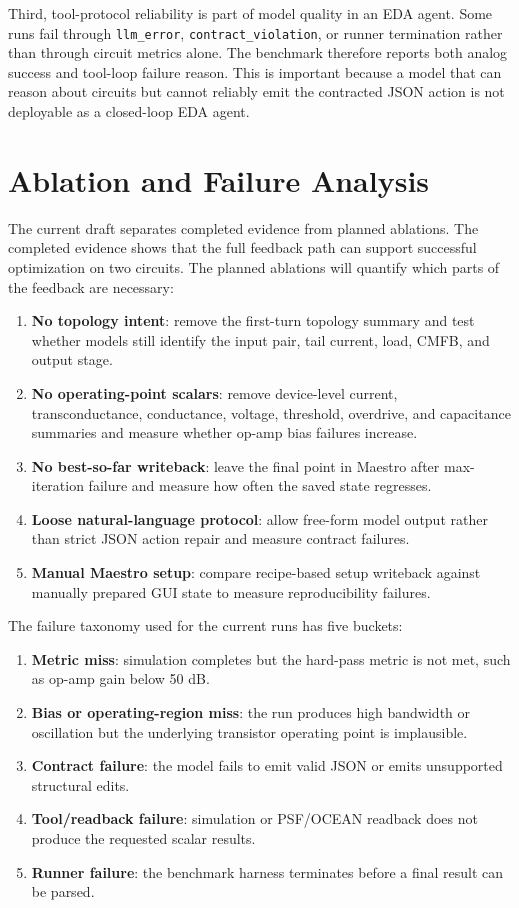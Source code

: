 \documentclass[acmsmall,review,anonymous]{acmart}
\newcommand{\metric}[1]{\texttt{#1}}
\begin{document}
Third, tool-protocol reliability is part of model quality in an EDA agent. Some
runs fail through \metric{llm\_error}, \metric{contract\_violation}, or runner
termination rather than through circuit metrics alone. The benchmark therefore
reports both analog success and tool-loop failure reason. This is important
because a model that can reason about circuits but cannot reliably emit the
contracted JSON action is not deployable as a closed-loop EDA agent.

\section{Ablation and Failure Analysis}
\label{sec:ablation}

The current draft separates completed evidence from planned ablations. The
completed evidence shows that the full feedback path can support successful
optimization on two circuits. The planned ablations will quantify which parts
of the feedback are necessary:
\begin{enumerate}
  \item \textbf{No topology intent}: remove the first-turn topology summary and
  test whether models still identify the input pair, tail current, load, CMFB,
  and output stage.
  \item \textbf{No operating-point scalars}: remove device-level current,
  transconductance, conductance, voltage, threshold, overdrive, and capacitance
  summaries and measure whether op-amp bias failures increase.
  \item \textbf{No best-so-far writeback}: leave the final point in Maestro
  after max-iteration failure and measure how often the saved state regresses.
  \item \textbf{Loose natural-language protocol}: allow free-form model output
  rather than strict JSON action repair and measure contract failures.
  \item \textbf{Manual Maestro setup}: compare recipe-based setup writeback
  against manually prepared GUI state to measure reproducibility failures.
\end{enumerate}

The failure taxonomy used for the current runs has five buckets:
\begin{enumerate}
  \item \textbf{Metric miss}: simulation completes but the hard-pass metric is
  not met, such as op-amp gain below 50 dB.
  \item \textbf{Bias or operating-region miss}: the run produces high bandwidth
  or oscillation but the underlying transistor operating point is implausible.
  \item \textbf{Contract failure}: the model fails to emit valid JSON or emits
  unsupported structural edits.
  \item \textbf{Tool/readback failure}: simulation or PSF/OCEAN readback does
  not produce the requested scalar results.
  \item \textbf{Runner failure}: the benchmark harness terminates before a
  final result can be parsed.
\end{enumerate}
\end{document}
